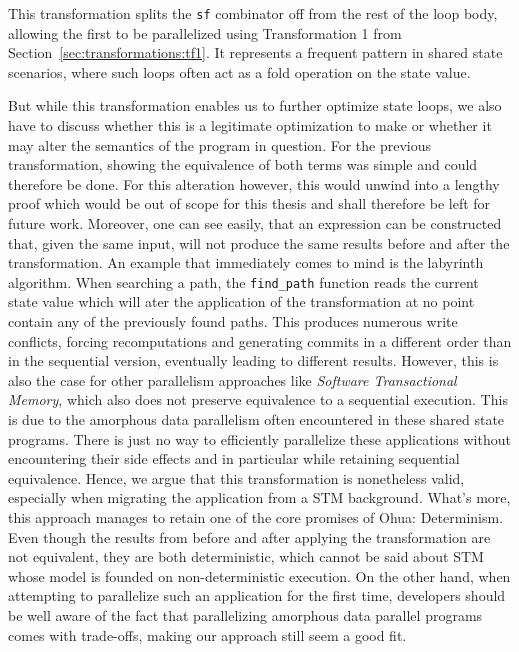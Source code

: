This transformation splits the \texttt{sf} combinator off from the rest of the loop body, allowing the first to be parallelized using Transformation 1 from Section~\ref{sec:transformations:tf1}.
It represents a frequent pattern in shared state scenarios, where such loops often act as a fold operation on the state value.

But while this transformation enables us to further optimize state loops, we also have to discuss whether this is a legitimate optimization to make or whether it may alter the semantics of the program in question.
For the previous transformation, showing the equivalence of both terms was simple and could therefore be done.
For this alteration however, this would unwind into a lengthy proof which would be out of scope for this thesis and shall therefore be left for future work.
Moreover, one can see easily, that an expression can be constructed that, given the same input, will not produce the same results before and after the transformation.
An example that immediately comes to mind is the labyrinth algorithm.
When searching a path, the \texttt{find\_path} function reads the current state value which will ater the application of the transformation at no point contain any of the previously found paths.
This produces numerous write conflicts, forcing recomputations and generating commits in a different order than in the sequential version, eventually leading to different results.
However, this is also the case for other parallelism approaches like \emph{Software Transactional Memory}, which also does not preserve equivalence to a sequential execution.
This is due to the amorphous data parallelism often encountered in these shared state programs.
There is just no way to efficiently parallelize these applications without encountering their side effects and in particular while retaining sequential equivalence.
Hence, we argue that this transformation is nonetheless valid, especially when migrating the application from a STM background.
What's more, this approach manages to retain one of the core promises of Ohua: Determinism.
Even though the results from before and after applying the transformation are not equivalent, they are both deterministic, which cannot be said about STM whose model is founded on non-deterministic execution.
On the other hand, when attempting to parallelize such an application for the first time, developers should be well aware of the fact that parallelizing amorphous data parallel programs comes with trade-offs, making our approach still seem a good fit.

